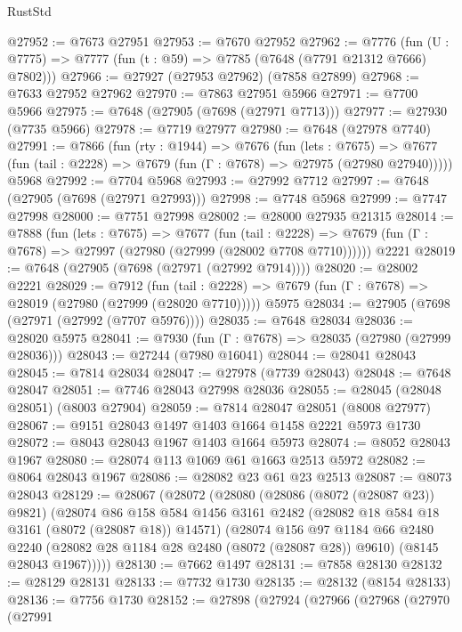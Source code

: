 \begin{lexlean}{RustStd}
\begin{coremodule}
{\begin{coremodule}
{{{{{{{{{{{{{{{{{{{{{{{{{{{{{{{{{{{{{{{{{{{{{{{{{{{{{@27952 := @7673 @27951
@27953 := @7670 @27952
@27962 := @7776
    (fun (U : @7775) => @7777 (fun (t : @59) => @7785 (@7648 (@7791 @21312 @7666) @7802)))
@27966 := @27927 (@27953 @27962) (@7858 @27899)
@27968 := @7633 @27952 @27962
@27970 := @7863 @27951 @5966
@27971 := @7700 @5966
@27975 := @7648 (@27905 (@7698 (@27971 @7713)))
@27977 := @27930 (@7735 @5966)
@27978 := @7719 @27977
@27980 := @7648 (@27978 @7740)
@27991 := @7866
    (fun (rty : @1944) =>
    @7676
      (fun (lets : @7675) =>
      @7677 (fun (tail : @2228) => @7679 (fun (Γ : @7678) => @27975 (@27980 @27940)))))
    @5968
@27992 := @7704 @5968
@27993 := @27992 @7712
@27997 := @7648 (@27905 (@7698 (@27971 @27993)))
@27998 := @7748 @5968
@27999 := @7747 @27998
@28000 := @7751 @27998
@28002 := @28000 @27935 @21315
@28014 := @7888
    (fun (lets : @7675) =>
    @7677
      (fun (tail : @2228) =>
      @7679 (fun (Γ : @7678) => @27997 (@27980 (@27999 (@28002 @7708 @7710))))))
    @2221
@28019 := @7648 (@27905 (@7698 (@27971 (@27992 @7914))))
@28020 := @28002 @2221
@28029 := @7912
    (fun (tail : @2228) => @7679 (fun (Γ : @7678) => @28019 (@27980 (@27999 (@28020 @7710)))))
    @5975
@28034 := @27905 (@7698 (@27971 (@27992 (@7707 @5976))))
@28035 := @7648 @28034
@28036 := @28020 @5975
@28041 := @7930 (fun (Γ : @7678) => @28035 (@27980 (@27999 @28036)))
@28043 := @27244 (@7980 @16041)
@28044 := @28041 @28043
@28045 := @7814 @28034
@28047 := @27978 (@7739 @28043)
@28048 := @7648 @28047
@28051 := @7746 @28043 @27998 @28036
@28055 := @28045 (@28048 @28051) (@8003 @27904)
@28059 := @7814 @28047 @28051 (@8008 @27977)
@28067 := @9151 @28043 @1497 @1403 @1664 @1458 @2221 @5973 @1730
@28072 := @8043 @28043 @1967 @1403 @1664 @5973
@28074 := @8052 @28043 @1967
@28080 := @28074 @113 @1069 @61 @1663 @2513 @5972
@28082 := @8064 @28043 @1967
@28086 := @28082 @23 @61 @23 @2513
@28087 := @8073 @28043
@28129 := @28067
    (@28072
      (@28080
        (@28086 (@8072 (@28087 @23)) @9821)
        (@28074
          @86
          @158
          @584
          @1456
          @3161
          @2482
          (@28082 @18 @584 @18 @3161 (@8072 (@28087 @18)) @14571)
          (@28074
            @156
            @97
            @1184
            @66
            @2480
            @2240
            (@28082 @28 @1184 @28 @2480 (@8072 (@28087 @28)) @9610)
            (@8145 @28043 @1967)))))
@28130 := @7662 @1497
@28131 := @7858 @28130
@28132 := @28129 @28131
@28133 := @7732 @1730
@28135 := @28132 (@8154 @28133)
@28136 := @7756 @1730
@28152 := @27898
    (@27924
      (@27966
        (@27968
          (@27970
            (@27991
}}}}}}}}}}}}}}}}}}}}}}}}}}}}}}}}}}}}}}}}}}}}}}}}}}}}}
\end{coremodule}}
\end{coremodule}
\end{lexlean}
